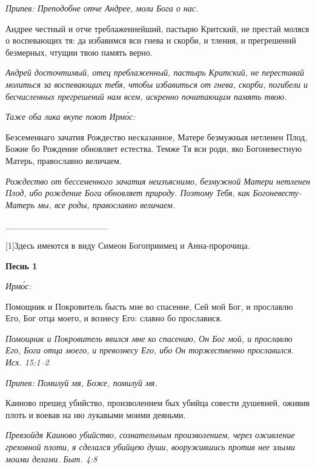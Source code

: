 \itshape Припев:\normalfont{} Преподобне отче Андрее, моли Бога о нас.


Андрее честный и отче треблаженнейший, пастырю Критский, не престай моляся о воспевающих тя: да избавимся вси гнева и скорби, и тления, и прегрешений безмерных, чтущии твою память верно.


\itshape Андрей досточтимый, отец преблаженный, пастырь Критский, не переставай молиться за воспевающих тебя, чтобы избавиться от гнева, скорби, погибели и бесчисленных прегрешений нам всем, искренно почитающим память твою.\normalfont{}


\itshape Таже оба лика вкупе поют Ирмо́с:\normalfont{}


Безсеменнаго зачатия Рождество несказанное, Матере безмужныя нетленен Плод, Божие бо Рождение обновляет естества. Темже Тя вси роди, яко Богоневестную Матерь, православно величаем.


\itshape Рождество от бессеменного зачатия неизъяснимо, безмужной Матери нетленен Плод, ибо рождение Бога обновляет природу. Поэтому Тебя, как Богоневесту-Матерь мы, все роды, православно величаем.\normalfont{}


________________


[1]Здесь имеются в виду Симеон Богоприимец и Анна-пророчица.


\mychapterending

 






\bfseries Песнь 1\normalfont{}


\itshape Ирмо́с:\normalfont{}


Помощник и Покровитель бысть мне во спасение, Сей мой Бог, и прославлю Его, Бог отца моего, и вознесу Его: славно бо прославися.


\itshape Помощник и Покровитель явился мне ко спасению, Он Бог мой, и прославлю Его, Бога отца моего, и превознесу Его, ибо Он торжественно прославился. Исх. 15:1–2\normalfont{}


\itshape Припев:\normalfont{} Помилуй мя, Боже, помилуй мя.


Каиново прешед убийство, произволением бых убийца совести душевней, оживив плоть и воевав на ню лукавыми моими деяньми.


\itshape Превзойдя Каиново убийство, сознательным произволением, через оживление греховной плоти, я сделался убийцею души, вооружившись против нее злыми моими делами. Быт. 4:8\normalfont{}


